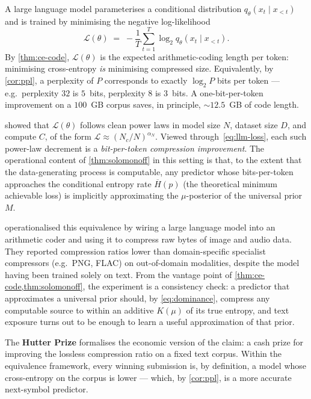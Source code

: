 \documentclass[12pt,a4paper]{article}
\theoremstyle{plain}
\theoremstyle{definition}
\begin{document}
A large language model parameterises a conditional distribution
$q_\theta(x_t \mid x_{<t})$ and is trained by minimising the
negative log-likelihood
\begin{equation}
  \mathcal{L}(\theta)
  \;=\; -\frac{1}{T}\sum_{t=1}^{T} \log_2 q_\theta(x_t \mid x_{<t}).
  \label{eq:llm-loss}
\end{equation}
By \cref{thm:ce-code}, $\mathcal{L}(\theta)$ is the expected
arithmetic-coding length per token: minimising cross-entropy
\emph{is} minimising compressed size.  Equivalently, by
\cref{cor:ppl}, a perplexity of $P$ corresponds to exactly
$\log_2 P$ bits per token --- e.g.\ perplexity $32$ is $5$~bits,
perplexity $8$ is $3$~bits.  A one-bit-per-token improvement on a
$100$~GB corpus saves, in principle, $\sim 12.5$~GB of code length.

\citet{kaplan2020scaling} showed that $\mathcal{L}(\theta)$ follows
clean power laws in model size $N$, dataset size $D$, and compute
$C$, of the form $\mathcal{L} \approx (N_c / N)^{\alpha_N}$.
Viewed through~\eqref{eq:llm-loss}, each such power-law decrement
is a \emph{bit-per-token compression improvement}.  The
operational content of \cref{thm:solomonoff} in this setting is
that, to the extent that the data-generating process is
computable, any predictor whose bits-per-token approaches the
conditional entropy rate $\overline{H}(p)$ (the theoretical
minimum achievable loss) is implicitly approximating the
$\mu$-posterior of the universal prior $M$.

\citet{deletang2024language} operationalised this equivalence by
wiring a large language model into an arithmetic coder and using
it to compress raw bytes of image and audio data.  They reported
compression ratios lower than domain-specific specialist
compressors (e.g.\ PNG, FLAC) on out-of-domain modalities, despite
the model having been trained solely on text.  From the vantage
point of \cref{thm:ce-code,thm:solomonoff}, the experiment is a
consistency check: a predictor that approximates a universal prior
should, by \eqref{eq:dominance}, compress any computable source to
within an additive $K(\mu)$ of its true entropy, and text exposure
turns out to be enough to learn a useful approximation of that
prior.

The \textbf{Hutter Prize} \citep{hutter2005universal} formalises
the economic version of the claim: a cash prize for improving the
lossless compression ratio on a fixed text corpus.  Within the
equivalence framework, every winning submission is, by definition,
a model whose cross-entropy on the corpus is lower --- which, by
\cref{cor:ppl}, is a more accurate next-symbol predictor.
\end{document}
